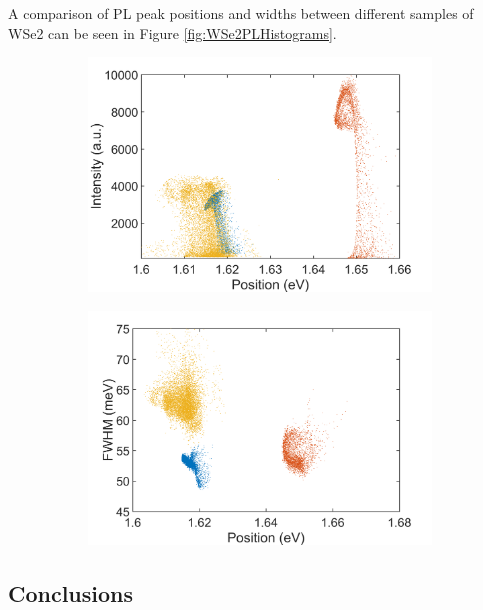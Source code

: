\documentclass[12pt]{article}
\begin{document}
{A comparison of PL peak positions and widths between different samples of WSe2 can be seen in Figure \ref{fig:WSe2PLHistograms}.

\begin{figure}[!h]
	\begin{center}
		\begin{subfigure}[b]{0.4\textwidth}
			\includegraphics[scale=0.2]{WSe2/WSe2PositionIntensityScatterComparison.png}
		\end{subfigure}
		\begin{subfigure}[b]{0.4\textwidth}
			\includegraphics[scale=0.2]{WSe2/Wse2PositionWidthScatterComparison.png}
		\end{subfigure}
	\end{center}
\end{figure}

	\subsection{Conclusions}

}
\end{document}
